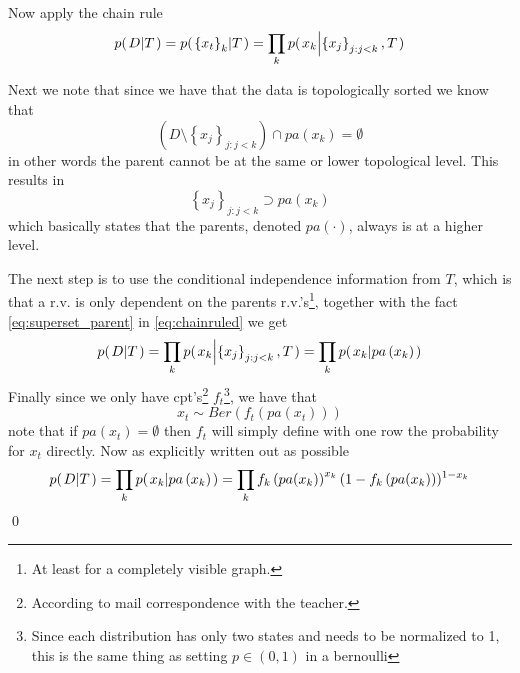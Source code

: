 \documentclass[a4paper,twoside=false,abstract=false,numbers=noenddot,
titlepage=false,headings=small,parskip=half,version=last]{scrartcl}
\begin{document}
\begin{solution}
    Now apply the chain rule
    \begin{equation}
        \label{eq:chainruled}
        p{(\left. D \middle\vert T \right.)} = p{(\left. \left\{x_t\right\}_{k} \middle\vert T \right.)} = 
        \prod_kp{(\left. x_k \middle\vert \left\{x_j\right\}_{j:j<k},T \right.)}
    \end{equation}

    Next we note that since we have that the data is topologically sorted
    we know that
    \begin{equation}
        \left(D \setminus \left\{x_j\right\}_{j:j<k}\right) \cap
        pa\left(x_k\right) = \emptyset
    \end{equation}
    in other words the parent cannot be at the same or lower topological level.
    This results in 
    \begin{equation}
        \label{eq:superset_parent}
        \left\{x_j\right\}_{j:j<k} \supset pa\left(x_k\right)
    \end{equation}
    which basically states that the parents, denoted 
    $pa(\cdot)$, always is at a higher level.
    
    The next step is to use the conditional independence information from $T$,
    which is that a r.v. is only dependent on the parents r.v.'s\footnote{At
    least for a completely visible graph.}, together with the fact
    \eqref{eq:superset_parent} in \eqref{eq:chainruled} we get 
    \begin{equation}
        p{(\left. D \middle\vert T \right.)} 
        =\prod_kp{(\left. x_k \middle\vert \left\{x_j\right\}_{j:j<k},T \right.)}
        =\prod_kp{(\left. x_k \middle\vert pa\left(x_k\right) \right.)}
    \end{equation}
    Finally since we only have cpt's\footnote{According to mail correspondence with
    the teacher.} $f_t$\footnote{Since each distribution has only two states
    and needs to be normalized
    to 1, this is the same thing as setting $p\in\left(0,1\right)$ in a
    bernoulli}, we have that
    \begin{equation}
        x_t \sim Ber\left(f_t(pa(x_t))\right) 
    \end{equation}
    note that if $pa(x_t)=\emptyset$ then $f_t$ will simply define with one row 
    the probability for $x_t$ directly.
    Now as explicitly written out as possible
    \begin{equation}
        \label{eq:A1}
        p{(\left. D \middle\vert T \right.)}
        =\prod_kp{(\left. x_k \middle\vert pa\left(x_k\right) \right.)}
        =\prod_k
        f_k\left(pa(x_k)\right)^{x_k}(1-f_k\left(pa(x_k)\right))^{1-x_k}
    \end{equation}
    \qed
\end{solution}
\end{document}
